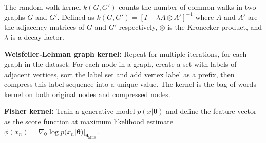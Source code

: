 \documentclass[12pt]{article}
\begin{document}
The random-walk kernel $k(G, G')$ counts the number of common walks in two graphs $G$ and $G'$. Defined as $k(G, G') = [I - \lambda A \otimes A']^{-1}$ where $A$ and $A'$ are the adjacency matrices of $G$ and $G'$ respectively, $\otimes$ is the Kronecker product, and $\lambda$ is a decay factor.

\textbf{Weisfeiler-Lehman graph kernel:} Repeat for multiple iterations, for each graph in the dataset: For each node in a graph, create a set with labels of adjacent vertices, sort the label set and add vertex label as a prefix, then compress this label sequence into a unique value. The kernel is the bag-of-words kernel on both original nodes and compressed nodes.

\textbf{Fisher kernel:} Train a generative model $p(x | \boldsymbol{\theta})$ and define the feature vector as the score function at maximum likelihood estimate $\phi(x_n) = \nabla_{\boldsymbol{\theta}} \log p(x_n | \boldsymbol{\theta}) |_{\boldsymbol{\theta}_\text{MLE}}$.
\end{document}
